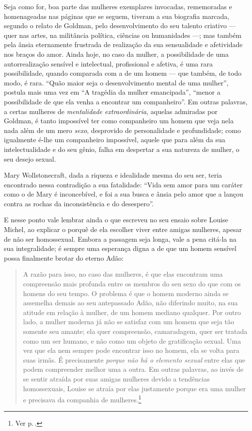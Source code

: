 Seja como for, boa parte das mulheres exemplares invocadas,
rememoradas e homenageadas nas páginas que se seguem, tiveram a sua
biografia marcada, segundo o relato de Goldman, pelo desenvolvimento do
seu talento criativo --- quer nas artes, na militância política, ciências
ou humanidades ---; mas também pela ânsia eternamente frustrada de
realização da sua sensualidade e afetividade nos braços do amor. Ainda
hoje, no caso da mulher, a possibilidade de uma autorrealização sensível
e intelectual, profissional e afetiva, é uma rara possibilidade, quando
comparada com a de um homem --- que também, de todo modo, é rara. ``Quão
maior seja o desenvolvimento mental de uma mulher'', postula mais uma
vez em ``A tragédia da mulher emancipada'', ``menor a possibilidade de
que ela venha a encontrar um companheiro''. Em outras palavras, a certas
mulheres de \textit{mentalidade extraordinária}, aquelas admiradas por
Goldman, é tanto impossível ter como companheiro um homem que veja nela
nada além de um mero \textit{sexo}, desprovido de personalidade e
profundidade; como igualmente é-lhe um companheiro impossível, aquele
que para além da sua intelectualidade e do seu gênio, falha em despertar
a sua natureza de mulher, o seu desejo sexual. 

Mary Wollstonecraft, dada
a riqueza e idealidade mesma do seu ser, teria encontrado nessa
contradição a sua fatalidade: ``Vida sem amor para um caráter como o de
Mary é inconcebível, e foi a sua busca e ânsia pelo amor que a lançou
contra as rochas da inconsistência e do desespero''.


E nesse ponto vale lembrar ainda o que
escreveu no seu ensaio sobre Louise Michel, ao explicar o porquê de ela
escolher viver entre amigas mulheres, apesar de não ser homossexual.
Embora a passagem seja longa, vale a pena citá-la na sua integralidade;
é sempre uma esperança digna a de que um homem sensível possa finalmente
brotar do eterno Adão:

\begin{quote}
A razão para isso, no caso das mulheres, é que elas encontram uma
compreensão mais profunda entre os membros do seu sexo do que
com os homens do seu tempo. O problema é que o homem moderno ainda se
assemelha demais ao seu antepassado Adão, não diferindo muito, na sua
atitude em relação à mulher, de um homem mediano qualquer. Por outro
lado, a mulher moderna já não se satisfaz com um homem que seja tão
somente seu amante; ela quer compreensão, camaradagem, quer ser tratada
como um ser humano, e não como um objeto de gratificação sexual. Uma vez
que ela nem sempre pode encontrar isso no homem, ela se volta para suas
irmãs. É precisamente \textit{porque não há o elemento sexual} entre elas
que podem compreender melhor uma a outra. Em outras palavras, ao
invés de se sentir atraída por suas amigas mulheres devido a
tendências homossexuais, Louise se atraía por elas justamente porque era
uma mulher e precisava da companhia de mulheres.\footnote{Ver p.\,\pageref{louise}.}
\end{quote}

